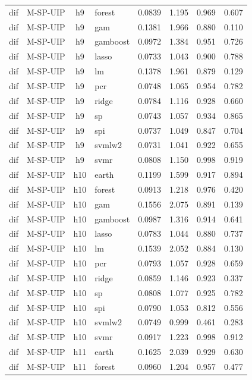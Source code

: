 \begin{ThreePartTable}
\begin{longtable}[t]{llclcccc}
dif & M-SP-UIP & h9 & forest & 0.0839 & 1.195 & 0.969 & 0.607\\
dif & M-SP-UIP & h9 & gam & 0.1381 & 1.966 & 0.880 & 0.110\\
dif & M-SP-UIP & h9 & gamboost & 0.0972 & 1.384 & 0.951 & 0.726\\
dif & M-SP-UIP & h9 & lasso & 0.0733 & 1.043 & 0.900 & 0.788\\
dif & M-SP-UIP & h9 & lm & 0.1378 & 1.961 & 0.879 & 0.129\\
dif & M-SP-UIP & h9 & pcr & 0.0748 & 1.065 & 0.954 & 0.782\\
dif & M-SP-UIP & h9 & ridge & 0.0784 & 1.116 & 0.928 & 0.660\\
dif & M-SP-UIP & h9 & sp & 0.0743 & 1.057 & 0.934 & 0.865\\
dif & M-SP-UIP & h9 & spi & 0.0737 & 1.049 & 0.847 & 0.704\\
dif & M-SP-UIP & h9 & svmlw2 & 0.0731 & 1.041 & 0.922 & 0.655\\
dif & M-SP-UIP & h9 & svmr & 0.0808 & 1.150 & 0.998 & 0.919\\
\addlinespace
dif & M-SP-UIP & h10 & earth & 0.1199 & 1.599 & 0.917 & 0.894\\
dif & M-SP-UIP & h10 & forest & 0.0913 & 1.218 & 0.976 & 0.420\\
dif & M-SP-UIP & h10 & gam & 0.1556 & 2.075 & 0.891 & 0.139\\
dif & M-SP-UIP & h10 & gamboost & 0.0987 & 1.316 & 0.914 & 0.641\\
dif & M-SP-UIP & h10 & lasso & 0.0783 & 1.044 & 0.880 & 0.737\\
dif & M-SP-UIP & h10 & lm & 0.1539 & 2.052 & 0.884 & 0.130\\
dif & M-SP-UIP & h10 & pcr & 0.0793 & 1.057 & 0.928 & 0.659\\
dif & M-SP-UIP & h10 & ridge & 0.0859 & 1.146 & 0.923 & 0.337\\
dif & M-SP-UIP & h10 & sp & 0.0808 & 1.077 & 0.925 & 0.782\\
dif & M-SP-UIP & h10 & spi & 0.0790 & 1.053 & 0.812 & 0.556\\
dif & M-SP-UIP & h10 & svmlw2 & 0.0749 & 0.999 & 0.461 & 0.283\\
dif & M-SP-UIP & h10 & svmr & 0.0917 & 1.223 & 0.998 & 0.912\\
\addlinespace
dif & M-SP-UIP & h11 & earth & 0.1625 & 2.039 & 0.929 & 0.630\\
dif & M-SP-UIP & h11 & forest & 0.0960 & 1.204 & 0.957 & 0.477\\

\end{longtable}
\end{ThreePartTable}
